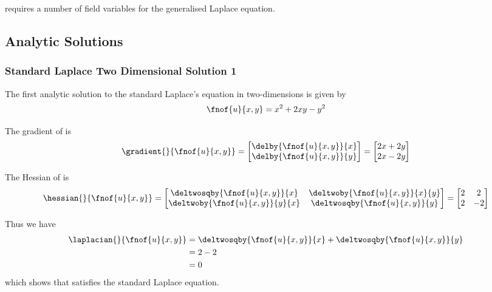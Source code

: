 \OpenCMISS requires a number of field variables for the generalised Laplace equation. 

\subsection{Analytic Solutions}

\subsubsection{Standard Laplace Two Dimensional Solution 1}

The first analytic solution to the standard Laplace's equation in two-dimensions is given by
\begin{equation}
  \fnof{u}{x,y}=x^{2}+2xy-y^{2}
  \label{eqn:StandardLaplaceTwoDAnalytic1}
\end{equation}

The gradient of  is
\begin{equation}
  \gradient{}{\fnof{u}{x,y}}=\begin{bmatrix}
  \delby{\fnof{u}{x,y}}{x} \\
  \delby{\fnof{u}{x,y}}{y}
  \end{bmatrix}=\begin{bmatrix}
  2x+2y \\
  2x-2y
  \end{bmatrix}
  \label{eqn:StandardLaplaceTwoDAnalyticGradient1}
\end{equation}

The Hessian of  is
\begin{equation}
  \hessian{}{\fnof{u}{x,y}}=\begin{bmatrix}
  \deltwosqby{\fnof{u}{x,y}}{x} & \deltwoby{\fnof{u}{x,y}}{x}{y} \\
  \deltwoby{\fnof{u}{x,y}}{y}{x} & \deltwosqby{\fnof{u}{x,y}}{y}
  \end{bmatrix}=\begin{bmatrix}
  2 & 2 \\
  2 & -2
  \end{bmatrix}
  \label{eqn:StandardLaplaceTwoDAnalyticHessian1}
\end{equation}

Thus we have
\begin{equation}
  \begin{aligned}
    \laplacian{}{\fnof{u}{x,y}}&=\deltwosqby{\fnof{u}{x,y}}{x}+\deltwosqby{\fnof{u}{x,y}}{y}\\
    &=2-2\\
    &=0
  \end{aligned}
\end{equation}
which shows that  satisfies the standard Laplace equation.

